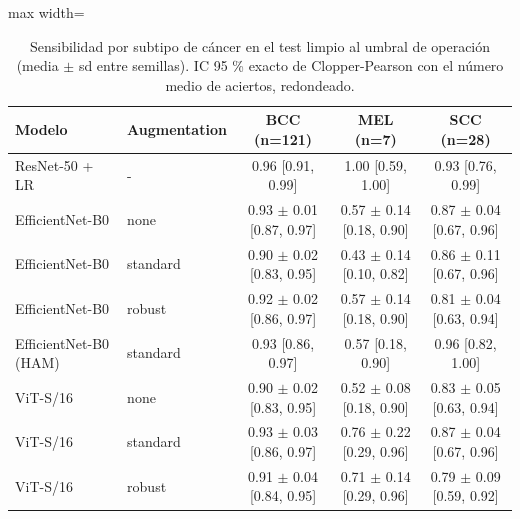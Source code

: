 \begin{table}[t]
\caption{Sensibilidad por subtipo de cáncer en el test limpio al umbral de operación (media $\pm$ sd entre semillas). IC 95 \% exacto de Clopper-Pearson con el número medio de aciertos, redondeado.}
\label{tab:subtype}
\centering
\begin{adjustbox}{max width=\linewidth}
\begin{tabular}{llccc}
\toprule
Modelo & Augmentation & BCC (n=121) & MEL (n=7) & SCC (n=28) \\
\midrule
ResNet-50 + LR & - & 0.96 [0.91, 0.99] & 1.00 [0.59, 1.00] & 0.93 [0.76, 0.99] \\
EfficientNet-B0 & none & 0.93 $\pm$ 0.01 [0.87, 0.97] & 0.57 $\pm$ 0.14 [0.18, 0.90] & 0.87 $\pm$ 0.04 [0.67, 0.96] \\
EfficientNet-B0 & standard & 0.90 $\pm$ 0.02 [0.83, 0.95] & 0.43 $\pm$ 0.14 [0.10, 0.82] & 0.86 $\pm$ 0.11 [0.67, 0.96] \\
EfficientNet-B0 & robust & 0.92 $\pm$ 0.02 [0.86, 0.97] & 0.57 $\pm$ 0.14 [0.18, 0.90] & 0.81 $\pm$ 0.04 [0.63, 0.94] \\
EfficientNet-B0 (HAM) & standard & 0.93 [0.86, 0.97] & 0.57 [0.18, 0.90] & 0.96 [0.82, 1.00] \\
ViT-S/16 & none & 0.90 $\pm$ 0.02 [0.83, 0.95] & 0.52 $\pm$ 0.08 [0.18, 0.90] & 0.83 $\pm$ 0.05 [0.63, 0.94] \\
ViT-S/16 & standard & 0.93 $\pm$ 0.03 [0.86, 0.97] & 0.76 $\pm$ 0.22 [0.29, 0.96] & 0.87 $\pm$ 0.04 [0.67, 0.96] \\
ViT-S/16 & robust & 0.91 $\pm$ 0.04 [0.84, 0.95] & 0.71 $\pm$ 0.14 [0.29, 0.96] & 0.79 $\pm$ 0.09 [0.59, 0.92] \\
\bottomrule
\end{tabular}
\end{adjustbox}
\end{table}
